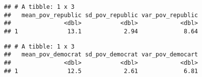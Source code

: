 \documentclass[]{article}
\newenvironment{Shaded}{\begin{snugshade}}{\end{snugshade}}
\newcommand{\CommentTok}[1]{\textcolor[rgb]{0.56,0.35,0.01}{\textit{#1}}}
\newcommand{\DataTypeTok}[1]{\textcolor[rgb]{0.13,0.29,0.53}{#1}}
\newcommand{\KeywordTok}[1]{\textcolor[rgb]{0.13,0.29,0.53}{\textbf{#1}}}
\newcommand{\NormalTok}[1]{#1}
\newcommand{\OperatorTok}[1]{\textcolor[rgb]{0.81,0.36,0.00}{\textbf{#1}}}
\newcommand{\StringTok}[1]{\textcolor[rgb]{0.31,0.60,0.02}{#1}}
\begin{document}
\begin{Shaded}
\end{Shaded}

\begin{verbatim}
## # A tibble: 1 x 3
##   mean_pov_republic sd_pov_republic var_pov_republic
##               <dbl>           <dbl>            <dbl>
## 1              13.1            2.94             8.64
\end{verbatim}

\begin{Shaded}
\end{Shaded}

\begin{verbatim}
## # A tibble: 1 x 3
##   mean_pov_democrat sd_pov_democrat var_pov_democart
##               <dbl>           <dbl>            <dbl>
## 1              12.5            2.61             6.81
\end{verbatim}
\end{document}
